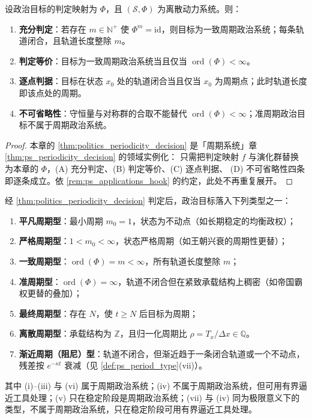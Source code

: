 \begin{theorem}[政治周期性判定定理]\label{thm:politics_periodicity_decision}
设政治目标的判定映射为 $\Phi$，且 $(\mathcal S,\Phi)$ 为离散动力系统。则：
\begin{enumerate}[label=(\Alph*)]
    \item \textbf{充分判定}：若存在 $m\in\mathbb N^+$ 使 $\Phi^m=\mathrm{id}$，则目标为一致周期政治系统；每条轨道闭合，且轨道长度整除 $m$。
    \item \textbf{判定等价}：目标为一致周期政治系统当且仅当 $\operatorname{ord}(\Phi)<\infty$。
    \item \textbf{逐点判据}：目标在状态 $x_0$ 处的轨道闭合当且仅当 $x_0$ 为周期点；此时轨道长度即该点处的周期。
    \item \textbf{不可省略性}：守恒量与对称群的合取不能替代 $\operatorname{ord}(\Phi)<\infty$；准周期政治目标不属于周期政治系统。
\end{enumerate}
\end{theorem}

\begin{proof}
本章的 \cref{thm:politics_periodicity_decision} 是「周期系统」章 \cref{thm:ps_periodicity_decision} 的领域实例化：
只需把判定映射 $f$ 与演化群替换为本章的 $\Phi$，(A) 充分判定、(B) 判定等价、(C) 逐点判据、
(D) 不可省略性四条即逐条成立。依 \cref{rem:ps_applications_hook} 的约定，此处不再重复展开。
\end{proof}

\begin{corollary}[政治周期类型]\label{cor:politics_period_type}
经 \cref{thm:politics_periodicity_decision} 判定后，政治目标落入下列类型之一：
\begin{enumerate}[label=(\roman*)]
    \item \textbf{平凡周期型}：最小周期 $m_0=1$，状态为不动点（如长期稳定的均衡政权）；
    \item \textbf{严格周期型}：$1<m_0<\infty$，状态严格周期（如王朝兴衰的周期性更替）；
    \item \textbf{一致周期型}：$\operatorname{ord}(\Phi)=m<\infty$，所有轨道长度整除 $m$；
    \item \textbf{准周期型}：$\operatorname{ord}(\Phi)=\infty$，轨道不闭合但在紧致承载结构上稠密（如帝国霸权更替的叠加）；
    \item \textbf{最终周期型}：存在 $N$，使 $t\ge N$ 后目标为周期；
    \item \textbf{离散周期型}：承载结构为 $\mathbb Z$，且归一化周期比 $\rho=T_x/\Delta x\in\mathbb Q$。
    \item \textbf{渐近周期（阻尼）型}：轨道不闭合，但渐近趋于一条闭合轨道或一个不动点，残差按 $e^{-\kappa t}$ 衰减（见 \cref{def:ps_period_type}(vii)）。
\end{enumerate}
其中 (i)--(iii) 与 (vi) 属于周期政治系统；(iv) 不属于周期政治系统，但可用有界逼近工具处理；(v) 只在稳定阶段是周期政治系统；(vii) 与 (iv) 同为极限意义下的类型，不属于周期政治系统，只在稳定阶段可用有界逼近工具处理。
\end{corollary}


